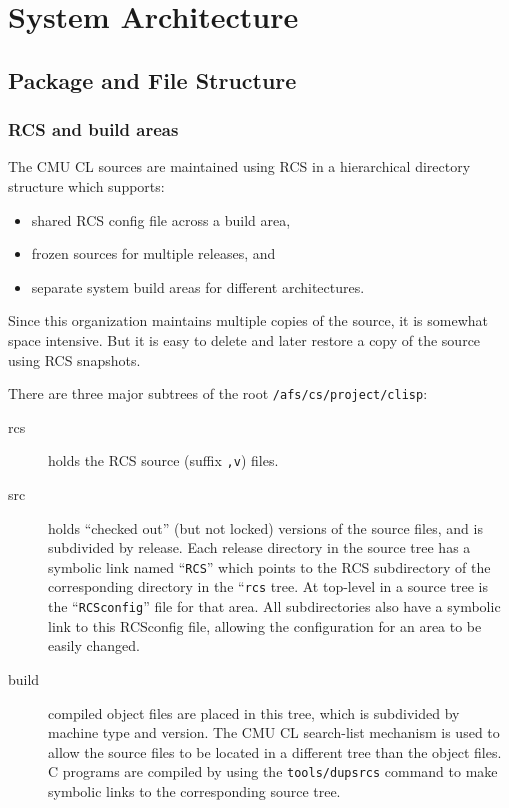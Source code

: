 \part{System Architecture}%

\chapter{Package and File Structure}

\section{RCS and build areas}

The CMU CL sources are maintained using RCS in a hierarchical directory
structure which supports:
\begin{itemize}
\item    shared RCS config file across a build area, 

\item    frozen sources for multiple releases, and 

\item    separate system build areas for different architectures.
\end{itemize}

Since this organization maintains multiple copies of the source, it is somewhat
space intensive.  But it is easy to delete and later restore a copy of the
source using RCS snapshots.

There are three major subtrees of the root \verb|/afs/cs/project/clisp|:
\begin{description}
\item[rcs] holds the RCS source (suffix \verb|,v|) files.

\item[src] holds ``checked out'' (but not locked) versions of the source files,
and is subdivided by release.  Each release directory in the source tree has a
symbolic link named ``{\tt RCS}'' which points to the RCS subdirectory of the
corresponding directory in the ``{\tt rcs} tree.  At top-level in a source tree
is the ``{\tt RCSconfig}'' file for that area.  All subdirectories also have a
symbolic link to this RCSconfig file, allowing the configuration for an area to
be easily changed.

\item[build] compiled object files are placed in this tree, which is subdivided
by machine type and version.  The CMU CL search-list mechanism is used to allow
the source files to be located in a different tree than the object files.  C
programs are compiled by using the \verb|tools/dupsrcs| command to make
symbolic links to the corresponding source tree.
\end{description}

